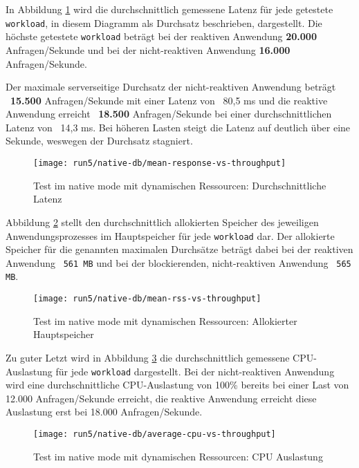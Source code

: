 In Abbildung \ref{fig:native_dynamic_mean_response} wird die durchschnittlich gemessene Latenz für jede getestete \verb|workload|,
in diesem Diagramm als Durchsatz beschrieben, dargestellt.
Die höchste getestete \verb|workload| beträgt bei der reaktiven Anwendung \textbf{20.000} Anfragen/Sekunde und bei der
nicht-reaktiven Anwendung \textbf{16.000} Anfragen/Sekunde.

Der maximale serverseitige Durchsatz der nicht-reaktiven Anwendung beträgt ~\textbf{15.500} Anfragen/Sekunde mit einer
Latenz von ~80,5 ms und
die reaktive Anwendung erreicht ~\textbf{18.500} Anfragen/Sekunde bei einer durchschnittlichen Latenz von ~14,3 ms.
Bei höheren Lasten steigt die Latenz auf deutlich über eine Sekunde, weswegen der Durchsatz stagniert.

\begin{figure}[ht!]
    \centering
    \texttt{[image: run5/native-db/mean-response-vs-throughput]}
    \caption{Test im native mode mit dynamischen Ressourcen: Durchschnittliche Latenz}
    \label{fig:native_dynamic_mean_response}
\end{figure}
\newpage
Abbildung \ref{fig:native_dynamic_mean_rss} stellt den durchschnittlich allokierten Speicher des jeweiligen Anwendungsprozesses
im Hauptspeicher für jede \verb|workload| dar. Der allokierte Speicher für die genannten maximalen Durchsätze beträgt dabei bei
der reaktiven Anwendung ~\verb|561 MB| und bei der blockierenden, nicht-reaktiven Anwendung ~\verb|565 MB|.

\begin{figure}[ht!]
    \centering
    \texttt{[image: run5/native-db/mean-rss-vs-throughput]}
    \caption{Test im native mode mit dynamischen Ressourcen: Allokierter Hauptspeicher}
    \label{fig:native_dynamic_mean_rss}
\end{figure}

Zu guter Letzt wird in Abbildung \ref{fig:native_dynamic_avg_cpu} die durchschnittlich gemessene CPU-Auslastung für jede \verb|workload|
dargestellt. Bei der nicht-reaktiven Anwendung wird eine durchschnittliche CPU-Auslastung von 100\% bereits bei einer Last von
12.000 Anfragen/Sekunde erreicht, die reaktive Anwendung erreicht diese Auslastung erst bei 18.000 Anfragen/Sekunde.
\newpage
\begin{figure}[ht!]
    \centering
    \texttt{[image: run5/native-db/average-cpu-vs-throughput]}
    \caption{Test im native mode mit dynamischen Ressourcen: CPU Auslastung}
    \label{fig:native_dynamic_avg_cpu}
\end{figure}

